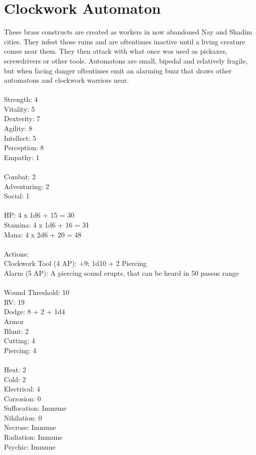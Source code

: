 \pagebreak
\section{Clockwork Automaton}

These brass constructs are created as workers in now abandoned Nay and Shadim cities. They infest those ruins and are oftentimes inactive until a living creature comes near them. They then attack with what once was used as pickaxes, screwdrivers or other tools.
Automatons are small, bipedal and relatively fragile, but when facing danger oftentimes emit an alarming buzz that draws other automatons and clockwork warriors near.\\
\\
Strength: 4\\
Vitality: 5\\
Dexterity: 7\\
Agility: 8\\
Intellect: 5\\
Perception: 8\\
Empathy: 1\\
\\
Combat: 2\\
Adventuring: 2\\
Social: 1\\
\\
HP: 4 x 1d6 + 15 = 30\\
Stamina: 4 x 1d6 + 16 = 31\\
Mana: 4 x 2d6 + 20 = 48\\
\\
Actions:\\
Clockwork Tool (4 AP): +9; 1d10 + 2 Piercing\\
Alarm (5 AP): A piercing sound erupts, that can be heard in 50 passus range\\
\\
Wound Threshold: 10\\
RV: 19\\
Dodge: 8 + 2 + 1d4\\
Armor\\
Blunt: 2\\
Cutting: 4\\
Piercing: 4\\
\\
Heat: 2\\
Cold: 2\\
Electrical: 4\\
Corrosion: 0\\
Suffocation: Immune\\
Nihilation: 0\\
Necrose: Immune\\
Radiation: Immune\\
Psychic: Immune\\